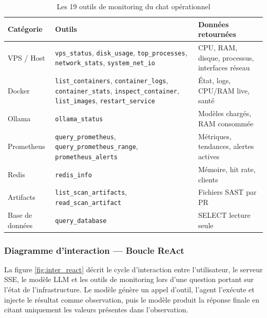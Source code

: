         \begin{table}[H]
        \centering
        \begin{tabular}{|m{2.5cm}|m{5cm}|m{5.5cm}|}
        \hline
        \textbf{Catégorie} & \textbf{Outils} & \textbf{Données retournées} \\
        \hline
        VPS / Host & \texttt{vps\_status}, \texttt{disk\_usage}, \texttt{top\_\allowbreak{}processes}, \texttt{network\_\allowbreak{}stats}, \texttt{system\_\allowbreak{}net\_\allowbreak{}io} & CPU, RAM, disque, processus, interfaces réseau \\
        \hline
        Docker & \texttt{list\_\allowbreak{}containers}, \texttt{container\_\allowbreak{}logs}, \texttt{container\_\allowbreak{}stats}, \texttt{inspect\_\allowbreak{}container}, \texttt{list\_images}, \texttt{restart\_\allowbreak{}service} & État, logs, CPU/RAM live, santé \\
        \hline
        Ollama & \texttt{ollama\_\allowbreak{}status} & Modèles chargés, RAM consommée \\
        \hline
        Prometheus & \texttt{query\_\allowbreak{}prometheus}, \texttt{query\_\allowbreak{}prometheus\_\allowbreak{}range}, \texttt{prometheus\_\allowbreak{}alerts} & Métriques, tendances, alertes actives \\
        \hline
        Redis & \texttt{redis\_info} & Mémoire, hit rate, clients \\
        \hline
        Artifacts & \texttt{list\_\allowbreak{}scan\_\allowbreak{}artifacts}, \texttt{read\_\allowbreak{}scan\_\allowbreak{}artifact} & Fichiers SAST par PR \\
        \hline
        Base de données & \texttt{query\_\allowbreak{}database} & SELECT lecture seule \\
        \hline
        \end{tabular}
        \caption{Les 19 outils de monitoring du chat opérationnel}
        \label{tab:tools}
        \end{table}

        \subsubsection{Diagramme d'interaction — Boucle ReAct}

        La figure \ref{fig:inter_react} décrit le cycle d'interaction entre l'utilisateur,
        le serveur SSE, le modèle LLM et les outils de monitoring lors d'une question
        portant sur l'état de l'infrastructure. Le modèle génère un appel d'outil, l'agent
        l'exécute et injecte le résultat comme observation, puis le modèle produit la
        réponse finale en citant uniquement les valeurs présentes dans l'observation.

